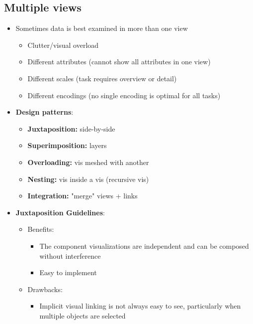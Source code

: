\documentclass{report}
\begin{document}
    \pagebreak 
    \subsection{Multiple views}
    \begin{itemize}
        \item Sometimes data is best examined in more than one view
            \begin{itemize}
                \item Clutter/visual overload
                \item Different attributes (cannot show all attributes in one view)
                \item Different scales (task requires overview or detail)
                \item Different encodings (no single encoding is optimal for all tasks)
            \end{itemize}
        \item \textbf{Design patterns}: 
            \begin{itemize}
                \item \textbf{Juxtaposition:} side-by-side
                \item \textbf{Superimposition:} layers
                \item \textbf{Overloading:} vis meshed with another
                \item \textbf{Nesting:} vis inside a vis (recursive vis)
                \item \textbf{Integration:} "merge" views + links
            \end{itemize}
            \bigbreak \noindent 
        \item \textbf{Juxtaposition Guidelines}: 
            \begin{itemize}
                \item Benefits:
                    \begin{itemize}
                        \item The component visualizations are independent and can be composed without interference
                        \item Easy to implement
                    \end{itemize}
                \item Drawbacks:
                    \begin{itemize}
                        \item Implicit visual linking is not always easy to see, particularly when multiple objects are selected

\end{itemize}
\end{itemize}
\end{itemize}
\end{document}
